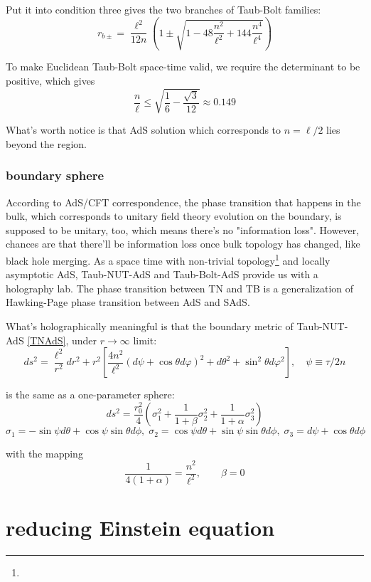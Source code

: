 \documentclass[12pt, a4paper]{article}
\numberwithin{equation}{section}
\newcommand{\be}{\begin{equation}}
\newcommand{\ee}{\end{equation}}
\begin{document}
Put it into condition three gives the two branches of Taub-Bolt families:
\be
r_{b\pm} = \frac{\ell^2}{12n}\left(1\pm \sqrt{1-48\frac{n^2}{\ell^2}+144\frac{n^4}{\ell^4}}\right)
\ee

To make Euclidean Taub-Bolt space-time valid, we require the determinant to be positive, which gives
\be
\frac{n}{\ell} \le \sqrt{\frac{1}{6}-\frac{\sqrt{3}}{12}} \approx 0.149
\ee

What's worth notice is that AdS solution which corresponds to $n = \ell/2$ lies beyond the region.

\subsubsection{boundary sphere}

According to AdS/CFT correspondence, the phase transition that happens in the bulk, which corresponds to unitary field theory evolution on the boundary, is supposed to be unitary, too, which means there's no "information loss". However, chances are that there'll be information loss once bulk topology has changed, like black hole merging. As a space time with non-trivial topology\footnote{\color{red}{The killing vectors have a zero-dimensional fixed point set for "NUT" and two-dimensional one for "Bolt".}} and locally asymptotic AdS, Taub-NUT-AdS and Taub-Bolt-AdS provide us with a holography lab.\cite{Chamblin:1998ah} The phase transition between TN and TB is a generalization of Hawking-Page phase transition between AdS and SAdS.

What's holographically meaningful is that the boundary metric of Taub-NUT-AdS \ref{TNAdS}, under $r\rightarrow \infty$ limit:
\be
ds^2 = \frac{\ell^2}{r^2}dr^2 +r^2\left[\frac{4n^2}{\ell^2}(d\psi +\cos\theta d\varphi)^2 + d\theta^2+\sin^2\theta d\varphi^2\right],\quad \psi \equiv \tau/2n
\ee

is the same as a one-parameter sphere\cite{Bobev:2016sh}:
\be
ds^2 = \frac{r_0^2}{4}\left(\sigma_1^2 +\frac{1}{1+\beta}\sigma_2^2 + \frac{1}{1+\alpha}\sigma_3^2\right)
\label{SquashedSphere}
\ee
\be
\sigma_1 = -\sin\psi d\theta +\cos\psi \sin\theta d\phi,\; \sigma_2 = \cos\psi d\theta +\sin\psi \sin\theta d\phi,\; \sigma_3 = d\psi +\cos\theta d\phi 
\ee

with the mapping
\be
\frac{1}{4(1+\alpha)} = \frac{n^2}{\ell^2},\qquad \beta = 0
\ee


\section{reducing Einstein equation}
\end{document}
